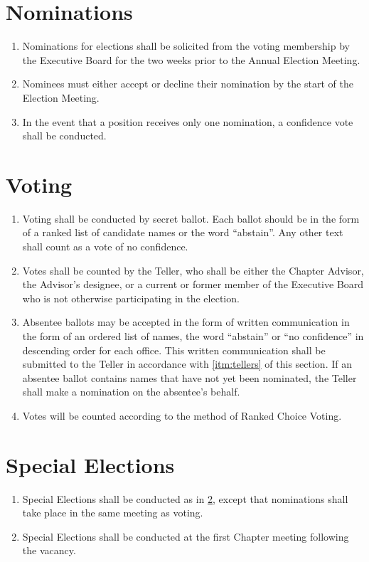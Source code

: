 \documentclass[12pt, letterpaper, oneside]{book}
\begin{document}
\section{Nominations}
\begin{enumerate}
    \item Nominations for elections shall be solicited from the voting
        membership by the Executive Board for the two weeks prior to the Annual
        Election Meeting. 
    \item Nominees must either accept or decline their nomination by the start
        of the Election Meeting.
    \item In the event that a position receives only one nomination, a
        confidence vote shall be conducted.
\end{enumerate}

\section{Voting} \label{sec:voting}
\begin{enumerate}
    \item Voting shall be conducted by secret ballot. Each ballot should be in
        the form of a ranked list of candidate names or the word ``abstain''.
        Any other text shall count as a vote of no confidence.
    \item \label{itm:tellers} Votes shall be counted by the Teller, who shall be
        either the Chapter Advisor, the Advisor's designee, or a current or
        former member of the Executive Board who is not otherwise participating
        in the election.
    \item Absentee ballots may be accepted in the form of written communication
        in the form of an ordered list of names, the word ``abstain'' or ``no
        confidence'' in descending order for each office. This written
        communication shall be submitted to the Teller in accordance with
        \cref{itm:tellers} of this section.
        \subitem If an absentee ballot contains names that have not yet been
        nominated, the Teller shall make a nomination on the absentee's behalf.
    \item Votes will be counted according to the method of Ranked Choice Voting.
\end{enumerate}

\section{Special Elections} \label{sec:specialelections}
\begin{enumerate}
    \item Special Elections shall be conducted as in \cref{sec:voting}, except
        that nominations shall take place in the same meeting as voting.
    \item Special Elections shall be conducted at the first Chapter meeting
        following the vacancy.
\end{enumerate}
\end{document}
